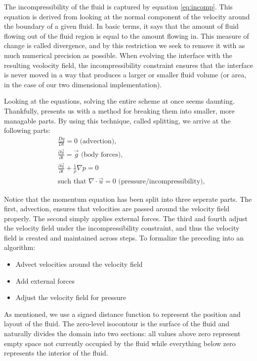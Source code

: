 The incompressibility of the fluid is captured by equation \vref{eq:incomp}. This equation is derived from looking at the normal component of the velocity around the boundary of a given fluid. In basic terms, it says that the amount of fluid flowing out of the fluid region is equal to the amount flowing in. This measure of change is called divergence, and by this restriction we seek to remove it with as much numerical precision as possible. When evolving the interface with the resulting veolocity field, the incompressibility constraint ensures that the interface is never moved in a way that produces a larger or smaller fluid volume (or area, in the case of our two dimensional implementation).

Looking at the equations, solving the entire scheme at once seems daunting. Thankfully,  presents us with a method for breaking them into smaller, more managable parts. By using this technique, called splitting, we arrive at the following parts:
\begin{eqnarray}
\label{eq:advection}
&\frac{Dq}{Dt}=0 \text{    (advection),}\\
\label{eq:forces}
&\frac{\partial \vec{u}}{\partial t} = \vec{g} \text{    (body forces),}\\
\label{eq:pressure}
&\frac{\partial \vec{u}}{\partial t} + \frac{1}{\rho}\nabla p = 0\\
\label{eq:divergence}
&\text{such that } \nabla\cdot\vec{u}=0 \text{    (pressure/incompressibility),}
\end{eqnarray}

Notice that the momentum equation has been split into three seperate parts. The first, advection, ensures that velocities are passed around the velocity field properly. The second simply applies external forces. The third and fourth adjust the velocity field under the incompressibility constraint, and thus the velocity field is created and maintained across steps. To formalize the preceding into an algorithm:
\begin{itemize}
\item Advect velocities around the velocity field
\item Add external forces
\item Adjust the velocity field for pressure
\end{itemize}
As mentioned, we use a signed distance function to represent the position and layout of the fluid. The zero-level isocontour is the surface of the fluid and naturally divides the domain into two sections: all values above zero represent empty space not currently occupied by the fluid while everything below zero represents the interior of the fluid.

